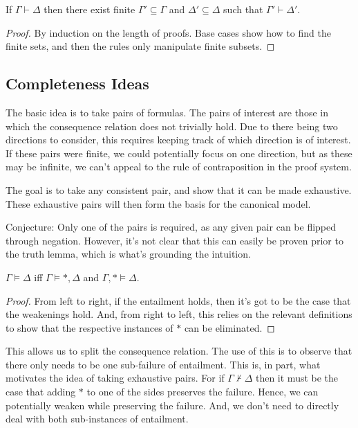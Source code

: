 \documentclass[10pt]{article}
\begin{document}
\begin{proposition}[Finiteness]
  If \(\Gamma \vdash \Delta\) then there exist finite \(\Gamma' \subseteq \Gamma\) and \(\Delta' \subseteq \Delta\) such that \(\Gamma' \vdash \Delta'\).
  \begin{proof}
    By induction on the length of proofs.
    Base cases show how to find the finite sets, and then the rules only manipulate finite subsets.
  \end{proof}
\end{proposition}


\subsection{Completeness Ideas}
\label{sec:completeness-ideas}

The basic idea is to take pairs of formulas.
The pairs of interest are those in which the consequence relation does not trivially hold.
Due to there being two directions to consider, this requires keeping track of which direction is of interest.
If these pairs were finite, we could potentially focus on one direction, but as these may be infinite, we can't appeal to the rule of contraposition in the proof system.

The goal is to take any consistent pair, and show that it can be made exhaustive.
These exhaustive pairs will then form the basis for the canonical model.

Conjecture: Only one of the pairs is required, as any given pair can be flipped through negation.
However, it's not clear that this can easily be proven prior to the truth lemma, which is what's grounding the intuition.




\begin{proposition}\label{prop:finiteness}
  \(\Gamma \vDash \Delta\) iff \(\Gamma \vDash \ast, \Delta\) and \(\Gamma, \ast \vDash \Delta\).
  \begin{proof}
    From left to right, if the entailment holds, then it's got to be the case that the weakenings hold.
And, from right to left, this relies on the relevant definitions to show that the respective instances of \(\ast\) can be eliminated.
  \end{proof}
\end{proposition}

This allows us to split the consequence relation.
The use of this is to observe that there only needs to be one sub-failure of entailment.
This is, in part, what motivates the idea of taking exhaustive pairs.
For if \(\Gamma \nvdash \Delta\) then it must be the case that adding \(\ast\) to one of the sides preserves the failure.
Hence, we can potentially weaken while preserving the failure.
And, we don't need to directly deal with both sub-instances of entailment.
\end{document}
